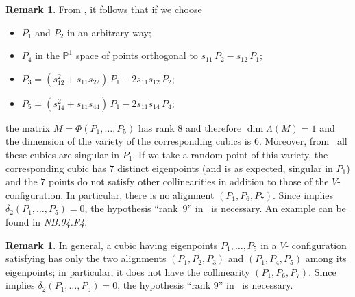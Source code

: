 \documentclass[a4paper, 11pt, reqno]{amsart}
\theoremstyle{plain}
\theoremstyle{definition}
\newtheorem{rmk}[lemma]{Remark}
\newcommand{\p}{\mathbb{P}}
\newcommand{\nb}[2]{\textsl{{NB}.{#1}.{#2}}}
\newcommand{\iso}{\mathcal{Q}_{\mathrm{iso}}}
\begin{document}
\begin{rmk}
From , it follows that if we choose
%
\begin{itemize}
  \item $P_1$ and $P_2$ in an arbitrary way;
  \item $P_4$ in the $\p^1$
  space of points orthogonal to $s_{11} \, P_2 - s_{12} \, P_1$;
  \item $P_3 = (s_{12}^2+s_{11}s_{22}) \, P_1 - 2s_{11}s_{12} \, P_2$;
  \item $P_5 = (s_{14}^2+s_{11}s_{44}) \, P_1 - 2s_{11}s_{14} \, P_4$;
\end{itemize}
%
the matrix $M = \Phi(P_1, \dots, P_5)$ has rank $8$
and therefore $\dim \Lambda(M) = 1$ and the dimension of the variety
of the corresponding cubics is $6$.
Moreover, from~ all these cubics
are singular in $P_1$.
If we take a random point of this variety, the corresponding
cubic has $7$ distinct eigenpoints (and is as expected, singular in $P_1$) and the
$7$ points do not satisfy other collinearities in addition to those of the
$V$- configuration.
In particular, there is no alignment $(P_1, P_6, P_7)$.
Since  implies $\delta_2(P_1, \dots, P_5) = 0$, the hypothesis ``rank~$9$'' in~ is necessary. An example can be found in 
\nb{04}{F4}.
\end{rmk}

\begin{rmk}
\label{remark:particular_cases}
In general, a cubic having eigenpoints $P_1, \dots, P_5$ in a $V$- configuration satisfying  has only the two alignments $(P_1, P_2, P_3)$ and $(P_1, P_4, P_5)$ among its eigenpoints;
in particular, it does not have the collinearity $(P_1, P_6, P_7)$.
Since  implies $\delta_2(P_1, \dots, P_5) = 0$, the hypothesis ``rank $9$'' in~ is necessary.
\end{rmk}
\end{document}
